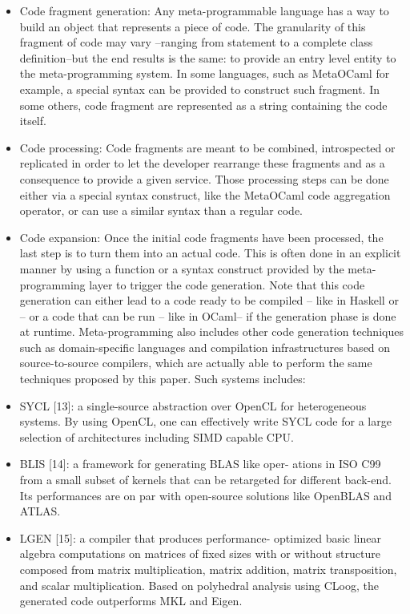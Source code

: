 \documentclass[../../main.tex]{subfiles}
\begin{document}
\begin{itemize}
\item Code fragment generation: Any meta-programmable
language has a way to build an object that represents a
piece of code. The granularity of this fragment of code
may vary –ranging from statement to a complete class
definition–but the end results is the same: to provide
an entry level entity to the meta-programming system.
In some languages, such as MetaOCaml for example,
a special syntax can be provided to construct such
fragment. In some others, code fragment are represented
as a string containing the code itself.

\item Code processing: Code fragments are meant to
be combined, introspected or replicated in order to
let the developer rearrange these fragments and as a
consequence to provide a given service. Those processing
steps can be done either via a special syntax construct,
like the MetaOCaml code aggregation operator, or can
use a similar syntax than a regular code.

\item Code expansion: Once the initial code fragments have
been processed, the last step is to turn them into an
actual code. This is often done in an explicit manner by
using a function or a syntax construct provided by the
meta-programming layer to trigger the code generation.
Note that this code generation can either lead to a code
ready to be compiled – like in Haskell or \cpp– or a
code that can be run – like in OCaml– if the generation
phase is done at runtime.
Meta-programming also includes other code generation
techniques such as domain-specific languages and compilation
infrastructures based on source-to-source compilers, which
are actually able to perform the same techniques proposed by
this paper. Such systems includes:

\item SYCL [13]: a single-source abstraction over OpenCL
for heterogeneous systems. By using OpenCL, one can
effectively write SYCL code for a large selection of
architectures including SIMD capable CPU.

\item BLIS [14]: a framework for generating BLAS like oper-
ations in ISO C99 from a small subset of kernels that can
be retargeted for different back-end. Its performances are
on par with open-source solutions like OpenBLAS and
ATLAS.

\item LGEN [15]: a compiler that produces performance-
optimized basic linear algebra computations on matrices
of fixed sizes with or without structure composed
from matrix multiplication, matrix addition, matrix
transposition, and scalar multiplication. Based on
polyhedral analysis using CLoog, the generated code
outperforms MKL and Eigen.
\end{itemize}
\end{document}
